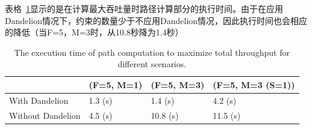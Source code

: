 \documentclass{ctexart}
\begin{document}





表格~\ref{table:eval1}显示的是在计算最大吞吐量时路径计算部分的执行时间。由于在应用Dandelion情况下，约束的数量少于不应用Dandelion情况，因此执行时间也会相应的降低（当F=5，M=3时，从10.8秒降为1.4秒）



\begin{table}[]
\footnotesize
\begin{tabular}{|l|l|l|l|}
\hline
             & \footnotesize(F=5, M=1) & \footnotesize (F=5, M=3) & \footnotesize (F=5, M=3 (S=1)) \\ \hline
With Dandelion    & 1.3 (s)    & 1.4 (s)    & 4.2 (s)          \\ \hline
Without Dandelion & 4.5 (s)    & 10.8 (s)   & 11.5 (s)         \\ \hline
\end{tabular}
\caption{\small The execution time of path computation to maximize total throughput for different scenarios.}
\label{table:eval1}
\end{table}
\end{document}
